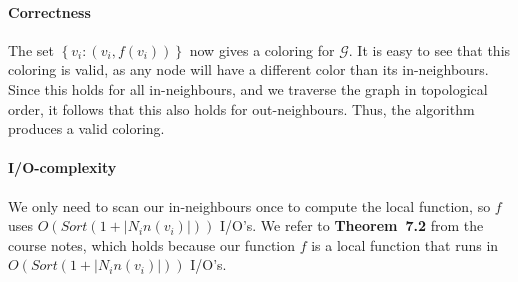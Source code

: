 \paragraph{Correctness}
	The set $\left\{v_i : (v_i, f(v_i))\right\}$ now gives a coloring for $\mathcal{G}$.
	It is easy to see that this coloring is valid, as any node will have a different color than its in-neighbours.
	Since this holds for all in-neighbours, and we traverse the graph in topological order, it follows that this also holds for out-neighbours.
	Thus, the algorithm produces a valid coloring.

\paragraph{I/O-complexity}
	We only need to scan our in-neighbours once to compute the local function, so $f$ uses $O(Sort(1+|N_in(v_i)|))$ I/O's.
	We refer to \textbf{Theorem~7.2} from the course notes, which holds because our function $f$ is a local function that runs in $O(Sort(1+|N_in(v_i)|))$ I/O's.
